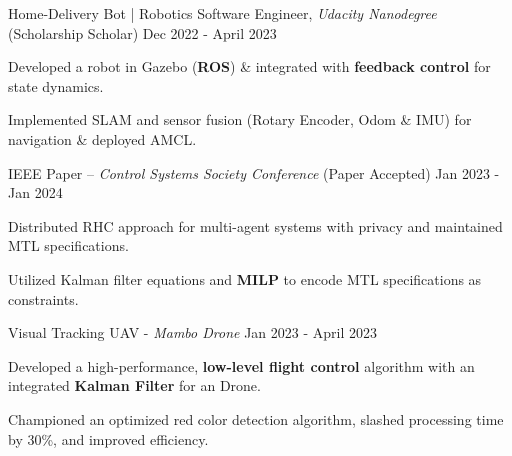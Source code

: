 



\begin{cventries}


  \cventry
    {Home-Delivery Bot \textnormal{ | Robotics Software Engineer, \textit{Udacity Nanodegree} (Scholarship Scholar)}} %
    {Dec 2022 - April 2023} %
    {
      \begin{cvitems} %
        \item {Developed a robot in Gazebo ({\bf ROS}) \& integrated with {\bf feedback control} for state dynamics.}
        \item {Implemented SLAM and sensor fusion (Rotary Encoder, Odom \& IMU) for navigation \& deployed AMCL.}
      \end{cvitems}
    }
    

  \cventry
    {IEEE Paper \textnormal{-- \textit{Control Systems Society Conference} (Paper Accepted)}} %
    {Jan 2023 - Jan 2024} %
    {
      \begin{cvitems} %
        \item {Distributed RHC approach for multi-agent systems with privacy and maintained MTL specifications.}
        \item{Utilized Kalman filter equations and {\bf MILP} to encode MTL specifications as constraints.}
      \end{cvitems}
    }


  \cventry
    {Visual Tracking UAV \textnormal{ - \textit{Mambo Drone}}} %
    { Jan 2023 - April 2023} %
    {
      \begin{cvitems} %
        \item {Developed a high-performance, {\bf low-level flight control} algorithm with an integrated {\bf Kalman Filter} for an Drone.}
        \item {Championed an optimized red color detection algorithm, slashed processing time by 30\%, and improved efficiency.}
      \end{cvitems}
    }

\end{cventries}
